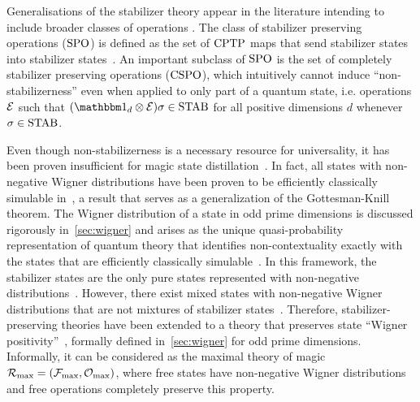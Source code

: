 \documentclass[pra,
aps,
twocolumn,
superscriptaddress,
groupedaddress,
nofootinbib,
reprint
]{revtex4-1}
\begin{document}
Generalisations of the stabilizer theory appear in the literature intending to include broader classes of operations .
The class of stabilizer preserving operations (${\rm{SPO}}$) is defined as the set of ${\rm{CPTP}}$ maps that send stabilizer states into stabilizer states~\cite{cit:ahmadi}.
An important subclass of ${\rm{SPO}}$ is the set of completely stabilizer preserving operations (${\rm{CSPO}}$), which intuitively cannot induce ``non-stabilizerness'' even when applied to only part of a quantum state, i.e. operations $\mathcal{E}$ such that $(\id_d \otimes \E ) \sigma \in \stab$ for all positive dimensions $d$ whenever $\sigma \in {\rm{STAB}}$.

Even though non-stabilizerness is a necessary resource for universality, it has been proven insufficient for magic state distillation~\cite{cit:bravyi, cit:campbell}.
In fact, all states with non-negative Wigner distributions have been proven to be efficiently classically simulable in~\cite{cit:mari}, a result that serves as a generalization of the Gottesman-Knill theorem.
The Wigner distribution of a state in odd prime dimensions is discussed rigorously in~\cref{sec:wigner} and arises as the unique quasi-probability representation of quantum theory that identifies non-contextuality exactly with the states that are efficiently classically simulable~\cite{cit:howard2, cit:veitch2}.
In this framework, the stabilizer states are the only pure states represented with non-negative distributions~\cite{cit:gross3}. 
However, there exist mixed states with non-negative Wigner distributions that are not mixtures of stabilizer states~\cite{cit:gross}.
Therefore, stabilizer-preserving theories have been extended to a theory that preserves state ``Wigner positivity''~\cite{cit:wang}, formally defined in~\cref{sec:wigner} for odd prime dimensions.
Informally, it can be considered as the maximal theory of magic $\mathcal{R}_{\rm{max}} = (\mathcal{F}_{\rm{max}}, \mathcal{O}_{\rm{max}})$, where free states have non-negative Wigner distributions and free operations completely preserve this property.\\ 

\end{document}

